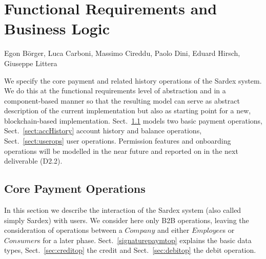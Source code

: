 \chapter{Functional Requirements and Business Logic}
\label{ch:funreq}


\vspace{-1cm}
\begin{center}
Egon B\"orger, Luca Carboni, Massimo Cireddu, Paolo Dini, Eduard Hirsch, Giuseppe Littera
\end{center}


We specify the core payment and related history operations of the Sardex system. We do this at the functional requirements  level of abstraction and in a component-based manner so that the resulting model can serve as abstract description of the current implementation but also as starting point for a new, blockchain-based implementation. Sect.~\ref{sect:paymtops} models  two basic payment operations, Sect.~\ref{sect:accHistory} account history and balance operations, Sect.~\ref{sect:userops} user operations. Permission features and onboarding operations will be modelled in the near future and reported on in the next deliverable (D2.2).


\section{Core Payment Operations}
\label{sect:paymtops}

In this section we describe the interaction of the Sardex system (also called simply Sardex)  with users. We consider here only B2B operations, leaving the consideration of operations between a $Company$ and either $Employee$s or $Consumer$s for a later phase. Sect.~\ref{signaturepaymtop} explains the basic data types,  Sect.~\ref{sec:creditop} the credit and  Sect.~\ref{sec:debitop} the debit operation.


